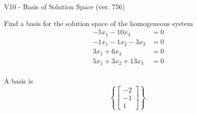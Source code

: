\begin{exercise}
  \begin{exerciseTitle}V10 - Basis of Solution Space (ver. 756)\end{exerciseTitle}
  \begin{exerciseStatement}
    Find a basis for the solution space of the homogeneous system 
\begin{align*}
 -5 x_ 1 -10 x_ 3 &= 0  \\ 
  -1 x_ 1 -1 x_ 2 -3 x_ 3 &= 0  \\ 
  3 x_ 1 + 6 x_ 3 &= 0  \\ 
  5 x_ 1 + 3 x_ 2 + 13 x_ 3 &= 0  \\ 
 \end{align*}


 
  \end{exerciseStatement}

  \begin{exerciseAnswer}
   A basis is   
\[\left\{\left[\begin{array}{c}
-2 \\
-1 \\
1
\end{array}\right]\right\}.\]

  


  \end{exerciseAnswer}
\end{exercise}